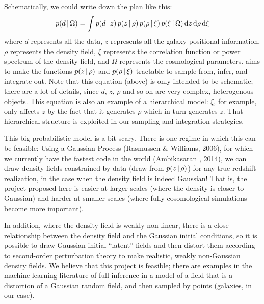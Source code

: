 \documentclass[12pt]{article}
\newcommand{\dd}{\mathrm{d}}
\begin{document}
Schematically, we could write down the plan like this:
\begin{equation}
p(d\given \Omega) = \int p(d\given z)\,p(z\given \rho)\,p(\rho\given \xi)\,p(\xi\given \Omega)\,\dd z\,\dd\rho\,\dd\xi
\end{equation}
where $d$ represents all the data, $z$ represents all the galaxy
positional information, $\rho$ represents the density field, $\xi$
represents the correlation function or power spectrum of the density
field, and $\Omega$ represents the cosmological parameters.
 aims to make the functions $p(z\,|\,\rho)$ and
$p(\rho\,|\,\xi)$ tractable to sample from, infer, and integrate out.
Note that this equation (above) is only intended to be schematic;
there are a lot of details, since $d$, $z$, $\rho$ and so on are very
complex, heterogenous objects.  This equation is also an example of a
hierarchical model: $\xi$, for example, only affects $z$ by the fact
that it generates $\rho$ which in turn generates $z$.  That
hierarchical structure is exploited in our sampling and integration
strategies.

This big probabilistic model is a bit scary.
There is one regime in which this can be feasible:
Using a Gaussian Process (Rasmussen \& Williams, 2006), for which we currently have
the fastest code in the world (Ambikasaran \etal, 2014), we can draw density fields
constrained by data (draw from $p(z\,|\,\rho)$) for any true-redshift realization, in the case
when the density field is indeed Gaussian!
That is, the project proposed here is easier at larger scales (where
the density is closer to Gaussian) and harder at smaller scales (where
fully cosomological simulations become more important).

In addition, where the density field is weakly non-linear, there is a close
relationship between the density field and the Gaussian initial
conditions, so it is possible to draw Gaussian initial ``latent''
fields and then distort them according to second-order perturbation
theory to make realistic, weakly non-Gaussian density fields.
We believe that this project is feasible; there are examples in
the machine-learning literature of full inference in a model of a
field that is a distortion of a Gaussian random field, and then
sampled by points (galaxies, in our case).
\end{document}
